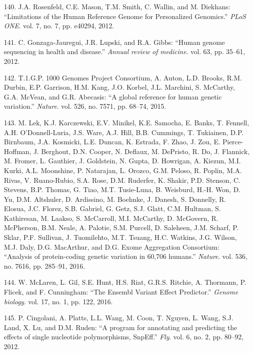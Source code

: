 \documentclass[12pt,twoside]{ugathesis}
\theoremstyle{definition}
\theoremstyle{definition}
\theoremstyle{remark}
\begin{document}
\hypertarget{ref-Rosenfeld2012}{}
140. J.A. Rosenfeld, C.E. Mason, T.M. Smith, C. Wallin, and M. Diekhans:
``Limitations of the Human Reference Genome for Personalized Genomics.''
\emph{PLoS ONE}. vol. 7, no. 7, pp. e40294, 2012.

\hypertarget{ref-Gonzaga-Jauregui2012}{}
141. C. Gonzaga-Jauregui, J.R. Lupski, and R.A. Gibbs: ``Human genome
sequencing in health and disease.'' \emph{Annual review of medicine}.
vol. 63, pp. 35--61, 2012.

\hypertarget{ref-1000GenomesProjectConsortium2015}{}
142. T.1.G.P. 1000 Genomes Project Consortium, A. Auton, L.D. Brooks,
R.M. Durbin, E.P. Garrison, H.M. Kang, J.O. Korbel, J.L. Marchini, S.
McCarthy, G.A. McVean, and G.R. Abecasis: ``A global reference for human
genetic variation.'' \emph{Nature}. vol. 526, no. 7571, pp. 68--74,
2015.

\hypertarget{ref-Lek2016}{}
143. M. Lek, K.J. Karczewski, E.V. Minikel, K.E. Samocha, E. Banks, T.
Fennell, A.H. O'Donnell-Luria, J.S. Ware, A.J. Hill, B.B. Cummings, T.
Tukiainen, D.P. Birnbaum, J.A. Kosmicki, L.E. Duncan, K. Estrada, F.
Zhao, J. Zou, E. Pierce-Hoffman, J. Berghout, D.N. Cooper, N. Deflaux,
M. DePristo, R. Do, J. Flannick, M. Fromer, L. Gauthier, J. Goldstein,
N. Gupta, D. Howrigan, A. Kiezun, M.I. Kurki, A.L. Moonshine, P.
Natarajan, L. Orozco, G.M. Peloso, R. Poplin, M.A. Rivas, V.
Ruano-Rubio, S.A. Rose, D.M. Ruderfer, K. Shakir, P.D. Stenson, C.
Stevens, B.P. Thomas, G. Tiao, M.T. Tusie-Luna, B. Weisburd, H.-H. Won,
D. Yu, D.M. Altshuler, D. Ardissino, M. Boehnke, J. Danesh, S. Donnelly,
R. Elosua, J.C. Florez, S.B. Gabriel, G. Getz, S.J. Glatt, C.M. Hultman,
S. Kathiresan, M. Laakso, S. McCarroll, M.I. McCarthy, D. McGovern, R.
McPherson, B.M. Neale, A. Palotie, S.M. Purcell, D. Saleheen, J.M.
Scharf, P. Sklar, P.F. Sullivan, J. Tuomilehto, M.T. Tsuang, H.C.
Watkins, J.G. Wilson, M.J. Daly, D.G. MacArthur, and D.G. Exome
Aggregation Consortium: ``Analysis of protein-coding genetic variation
in 60,706 humans.'' \emph{Nature}. vol. 536, no. 7616, pp. 285--91,
2016.

\hypertarget{ref-McLaren2016}{}
144. W. McLaren, L. Gil, S.E. Hunt, H.S. Riat, G.R.S. Ritchie, A.
Thormann, P. Flicek, and F. Cunningham: ``The Ensembl Variant Effect
Predictor.'' \emph{Genome biology}. vol. 17, no. 1, pp. 122, 2016.

\hypertarget{ref-Cingolani2012}{}
145. P. Cingolani, A. Platts, L.L. Wang, M. Coon, T. Nguyen, L. Wang,
S.J. Land, X. Lu, and D.M. Ruden: ``A program for annotating and
predicting the effects of single nucleotide polymorphisms, SnpEff.''
\emph{Fly}. vol. 6, no. 2, pp. 80--92, 2012.
\end{document}

